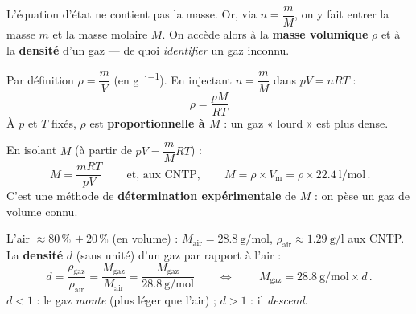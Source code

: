 \documentclass[11pt,a4paper]{article}
\begin{document}

L'équation d'état ne contient pas la masse. Or, via $n=\dfrac{m}{M}$, on y fait entrer la masse $m$ et
la masse molaire $M$. On accède alors à la \textbf{masse volumique} $\rho$ et à la \textbf{densité}
d'un gaz — de quoi \emph{identifier} un gaz inconnu.

\begin{cle}
Par définition $\rho=\dfrac{m}{V}$ (en \si{\gram\per\litre}). En injectant $n=\dfrac{m}{M}$ dans
$pV=nRT$ :
\[ \boxed{\,\rho=\frac{pM}{RT}\,} \]
À $p$ et $T$ fixés, $\rho$ est \textbf{proportionnelle à $M$} : un gaz « lourd » est plus dense.
\end{cle}

\begin{cle}
En isolant $M$ (à partir de $pV=\dfrac{m}{M}RT$) :
\[ \boxed{\,M=\frac{mRT}{pV}\,}
   \qquad\text{et, aux CNTP,}\qquad
   \boxed{\,M=\rho\times V_{\mathrm{m}}=\rho\times\qty{22.4}{\litre\per\mole}\,}. \]
C'est une méthode de \textbf{détermination expérimentale} de $M$ : on pèse un gaz de volume connu.
\end{cle}

\begin{cle}
L'air $\approx 80\,\%$  $+\ 20\,\%$  (en volume) : $M_{\text{air}}=\qty{28.8}{\gram\per\mole}$,
$\rho_{\text{air}}\approx\qty{1.29}{\gram\per\litre}$ aux CNTP. La \textbf{densité} $d$ (sans unité) d'un
gaz par rapport à l'air :
\[ d=\frac{\rho_{\text{gaz}}}{\rho_{\text{air}}}=\frac{M_{\text{gaz}}}{M_{\text{air}}}
   =\frac{M_{\text{gaz}}}{\qty{28.8}{\gram\per\mole}}
   \qquad\Longleftrightarrow\qquad
   \boxed{\,M_{\text{gaz}}=\qty{28.8}{\gram\per\mole}\times d\,}. \]
$d<1$ : le gaz \emph{monte} (plus léger que l'air) ; $d>1$ : il \emph{descend}.
\end{cle}

\begin{center}
\end{center}
\end{document}
